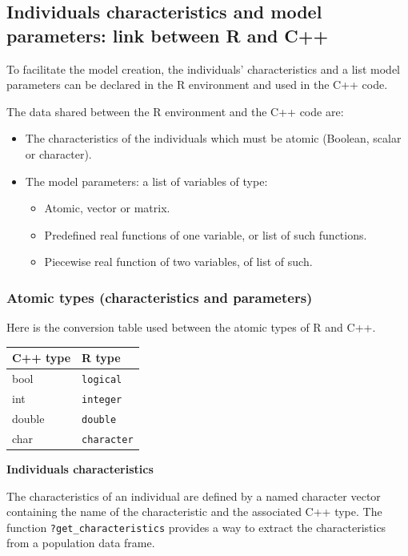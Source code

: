 \hypertarget{cppcharacteristics}{%
\subsection{Individuals characteristics and model parameters: link between R and C++}\label{cppcharacteristics}}

To facilitate the model creation, the individuals' characteristics and a list model parameters can be declared in the R environment and used in the C++ code.

The data shared between the R environment and the C++ code are:

\begin{itemize}
\tightlist
\item
  The characteristics of the individuals which must be atomic (Boolean, scalar or character).
\item
  The model parameters: a list of variables of type:

  \begin{itemize}
  \tightlist
  \item
    Atomic, vector or matrix.
  \item
    Predefined real functions of one variable, or list of such functions.
  \item
    Piecewise real function of two variables, of list of such.
  \end{itemize}
\end{itemize}

\hypertarget{atomic-types-characteristics-and-parameters}{%
\subsubsection{Atomic types (characteristics and parameters)}\label{atomic-types-characteristics-and-parameters}}

Here is the conversion table used between the atomic types of R and C++.

\begin{longtable}[]{@{}ll@{}}
\toprule
C++ type & R type\tabularnewline
\midrule
\endhead
bool & \texttt{logical}\tabularnewline
int & \texttt{integer}\tabularnewline
double & \texttt{double}\tabularnewline
char & \texttt{character}\tabularnewline
\bottomrule
\end{longtable}

\textbf{Individuals characteristics}

The characteristics of an individual are defined by a named character vector containing the name of the characteristic and the associated C++ type. The function \texttt{?get\_characteristics} provides a way to extract the characteristics from a population data frame.

